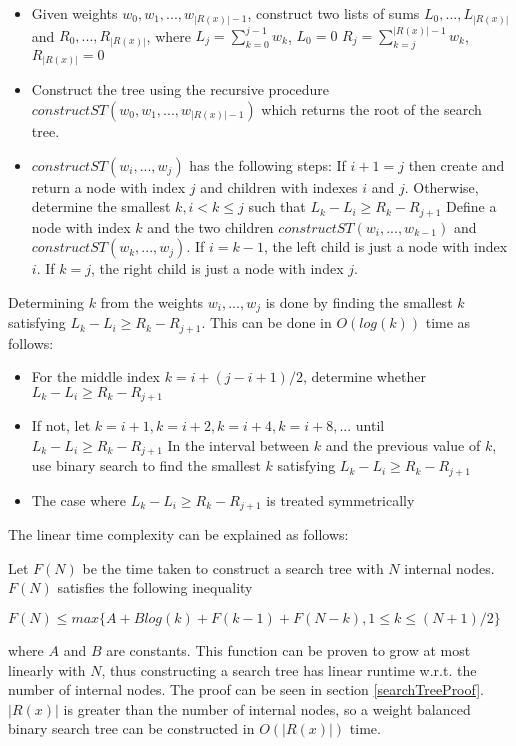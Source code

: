 \begin{itemize}
	\item Given weights ${w_0, w_1, ..., w_{|R(x)|-1}}$, construct two lists of sums ${L_0, ..., L_{|R(x)|}}$ and ${R_0, ..., R_{|R(x)|}}$, where
	\subitem $L_j=\sum_{k=0}^{j-1} w_k$, $L_0=0$
	\subitem $R_j=\sum_{k=j}^{|R(x)|-1} w_k$, $R_{|R(x)|}=0$
	\item Construct the tree using the recursive procedure $constructST(w_0, w_1, ..., w_{|R(x)|-1})$ which returns the root of the search tree.
	\item $constructST(w_i, ..., w_j)$ has the following steps:
	\subitem If $i+1=j$ then create and return a node with index $j$ and children with indexes $i$ and $j$.
	\subitem Otherwise, determine the smallest $k, i<k\le j$ such that
	\subsubitem $L_k-L_i \ge R_k-R_{j+1}$
	\subitem Define a node with index $k$ and the two children $constructST(w_i, ..., w_{k-1})$ and $constructST(w_k, ..., w_j)$.
	\subsubitem If $i=k-1$, the left child is just a node with index $i$.
	\subsubitem If $k=j$, the right child is just a node with index $j$.
\end{itemize}

Determining $k$ from the weights ${w_i, ..., w_j}$ is done by finding the smallest $k$ satisfying $L_k-L_i \ge R_k-R_{j+1}$. This can be done in $O(log(k))$ time as follows:

\begin{itemize}
	\item For the middle index $k=i+(j-i+1)/2$, determine whether $L_k-L_i \ge R_k-R_{j+1}$
	\item If not, let $k=i+1, k=i+2, k=i+4, k=i+8, ...$ until $L_k-L_i \ge R_k-R_{j+1}$
	\subitem In the interval between $k$ and the previous value of $k$, use binary search to find the smallest $k$ satisfying $L_k-L_i \ge R_k-R_{j+1}$
	\item The case where $L_k-L_i \ge R_k-R_{j+1}$ is treated symmetrically\\
\end{itemize}
The linear time complexity can be explained as follows:

Let $F(N)$ be the time taken to construct a search tree with $N$ internal nodes. $F(N)$ satisfies the following inequality

$F(N) \le max\{A + Blog(k) + F(k-1) + F(N-k), 1 \le k \le (N+1)/2\}$

where $A$ and $B$ are constants. This function can be proven to grow at most linearly with $N$, thus constructing a search tree has linear runtime w.r.t. the number of internal nodes. The proof can be seen in section \ref{searchTreeProof}. $|R(x)|$ is greater than the number of internal nodes, so a weight balanced binary search tree can be constructed in $O(|R(x)|)$ time.

